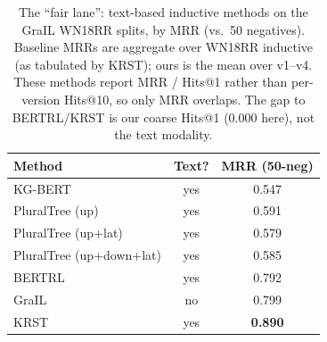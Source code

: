 \begin{table}[t]
\centering
\caption{The ``fair lane'': text-based inductive methods on the GraIL WN18RR
splits, by MRR (vs.\ 50 negatives). Baseline MRRs are aggregate over WN18RR
inductive (as tabulated by KRST); ours is the mean over v1--v4. These methods
report MRR / Hits@1 rather than per-version Hits@10, so only MRR overlaps. The
gap to BERTRL/KRST is our coarse Hits@1 (0.000 here), not the text modality.}
\label{tab:grail-textbased}
\begin{tabular}{@{}lcc@{}}
\toprule
Method & Text? & MRR (50-neg) \\
\midrule
KG-BERT \citep{yao2019kgbert}        & yes & 0.547 \\
PluralTree (up)                      & yes & 0.591 \\
PluralTree (up+lat)                  & yes & 0.579 \\
PluralTree (up+down+lat)             & yes & 0.585 \\
BERTRL \citep{zha2022bertrl}         & yes & 0.792 \\
GraIL \citep{teru2020grail}          & no  & 0.799 \\
KRST \citep{su2023krst}              & yes & \textbf{0.890} \\
\bottomrule
\end{tabular}
\end{table}


